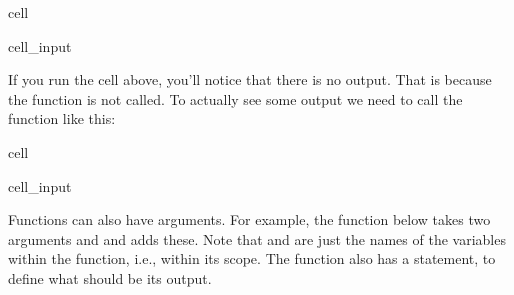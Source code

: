 \documentclass[letterpaper,10pt,english]{jupyterBook}
\begin{document}
\begin{sphinxuseclass}{cell}\begin{sphinxVerbatimInput}

\begin{sphinxuseclass}{cell_input}
\begin{sphinxVerbatim}[commandchars=\\\{\}]
 
     
\end{sphinxVerbatim}

\end{sphinxuseclass}\end{sphinxVerbatimInput}

\end{sphinxuseclass}
\sphinxAtStartPar
If you run the cell above, you’ll notice that there is no output. That is because the function is not called. To actually see some output we need to call the function like this:

\begin{sphinxuseclass}{cell}\begin{sphinxVerbatimInput}

\begin{sphinxuseclass}{cell_input}
\begin{sphinxVerbatim}[commandchars=\\\{\}]
\end{sphinxVerbatim}

\end{sphinxuseclass}\end{sphinxVerbatimInput}

\end{sphinxuseclass}
\sphinxAtStartPar
Functions can also have arguments. For example, the function below takes two arguments  and  and adds these. Note that  and  are just the names of the variables within the function, i.e., within its scope. The function also has a  statement, to define what should be its output.
\end{document}
